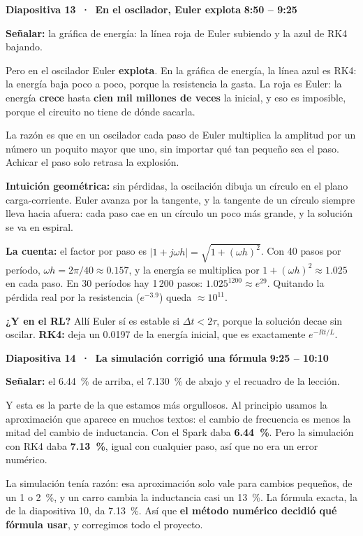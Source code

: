 \documentclass[11pt,a4paper]{article}
\newcommand{\diapo}[3]{%
  \par\vspace{8pt}
  {\large\bfseries Diapositiva #1 \,·\, #2}\hfill{\normalsize\bfseries\color{AzulIcesi} #3}\par
  \vspace{1pt}}
\newcommand{\senala}[1]{{\small\color{AzulIcesi}\textbf{Señalar:} #1}\par}
\begin{document}
\diapo{13}{En el oscilador, Euler explota}{8:50 -- 9:25}
\senala{la gráfica de energía: la línea roja de Euler subiendo y la azul de RK4 bajando.}

Pero en el oscilador Euler \textbf{explota}. En la gráfica de energía, la línea azul es RK4: la energía baja poco a
poco, porque la resistencia la gasta. La roja es Euler: la energía \textbf{crece} hasta \textbf{cien mil millones
de veces} la inicial, y eso es imposible, porque el circuito no tiene de dónde sacarla.

La razón es que en un oscilador cada paso de Euler multiplica la amplitud por un número un poquito mayor que uno,
sin importar qué tan pequeño sea el paso. Achicar el paso solo retrasa la explosión.

\begin{nota}
\textbf{Intuición geométrica:} sin pérdidas, la oscilación dibuja un círculo en el plano carga-corriente. Euler
avanza por la tangente, y la tangente de un círculo siempre lleva hacia afuera: cada paso cae en un círculo un poco
más grande, y la solución se va en espiral.

\textbf{La cuenta:} el factor por paso es $|1+j\omega h| = \sqrt{1+(\omega h)^2}$. Con 40 pasos por período,
$\omega h = 2\pi/40 \approx 0.157$, y la energía se multiplica por $1+(\omega h)^2 \approx 1.025$ en cada paso. En
30 períodos hay 1\,200 pasos: $1.025^{1200} \approx e^{29}$. Quitando la pérdida real por la resistencia
($e^{-3.9}$) queda $\approx 10^{11}$.

\textbf{¿Y en el RL?} Allí Euler sí es estable si $\Delta t < 2\tau$, porque la solución decae sin oscilar.
\textbf{RK4:} deja un 0.0197 de la energía inicial, que es exactamente $e^{-Rt/L}$.
\end{nota}

\diapo{14}{La simulación corrigió una fórmula}{9:25 -- 10:10}
\senala{el 6.44~\% de arriba, el 7.130~\% de abajo y el recuadro de la lección.}

Y esta es la parte de la que estamos más orgullosos. Al principio usamos la aproximación que aparece en muchos
textos: el cambio de frecuencia es menos la mitad del cambio de inductancia. Con el Spark daba \textbf{6.44~\%}.
Pero la simulación con RK4 daba \textbf{7.13~\%}, igual con cualquier paso, así que no era un error numérico.

La simulación tenía razón: esa aproximación solo vale para cambios pequeños, de un 1 o 2~\%, y un carro cambia la
inductancia casi un 13~\%. La fórmula exacta, la de la diapositiva 10, da 7.13~\%. Así que \textbf{el método
numérico decidió qué fórmula usar}, y corregimos todo el proyecto.
\end{document}
